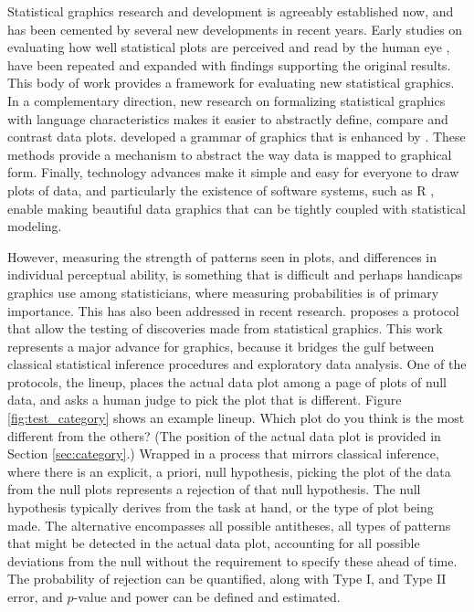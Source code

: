 \documentclass{article}
\begin{document}
Statistical graphics research and development is agreeably established now, and has been cemented by several new developments in recent years. Early studies on evaluating how well statistical plots are perceived and read by the human eye \citep{cleveland:1984}, have been repeated and expanded \citep{heer:2010} with findings supporting the original results. This body of work provides a framework for evaluating new statistical graphics.  In a complementary direction, new research on formalizing statistical graphics with language characteristics makes it easier to abstractly define, compare and contrast data plots. \cite{wilkinson:1999} developed a grammar of graphics that is enhanced by \cite{hadley:2009}. These methods provide a mechanism to abstract the way data is mapped to graphical form. Finally, technology advances make it simple and easy for everyone to draw plots of data, and particularly the existence of software systems, such as R \citep{R}, enable making beautiful data graphics that can be tightly coupled with statistical modeling.

However, measuring the strength of patterns seen in plots, and differences in individual perceptual ability, is something that is difficult and perhaps handicaps graphics  use among statisticians, where measuring probabilities is of primary importance. This has also been addressed in recent research. \citet{buja:2009} proposes a protocol that allow the testing of discoveries made from statistical graphics. This work represents a major advance for graphics, because it bridges the gulf between classical statistical inference procedures and exploratory data analysis. One of the protocols, the lineup, places the actual data plot among  a page of plots of null data, and asks a human judge to pick the plot that is different. Figure \ref{fig:test_category} shows an example lineup. Which plot do you think is the most different from the others? (The position of the actual data plot is provided in Section \ref{sec:category}.) Wrapped in a process that mirrors classical inference, where there is an explicit, a priori, null hypothesis, picking the plot of the data from the null plots represents a rejection of that null hypothesis. The null hypothesis typically derives from the task at hand, or the type of plot being made. The alternative encompasses all possible antitheses, all types of patterns that might be detected in the actual data plot, accounting for all possible deviations from the null without the requirement to specify these ahead of time. The probability of rejection can be quantified, along with Type I, and Type II error, and $p$-value and power can be defined and estimated. 
\end{document}
